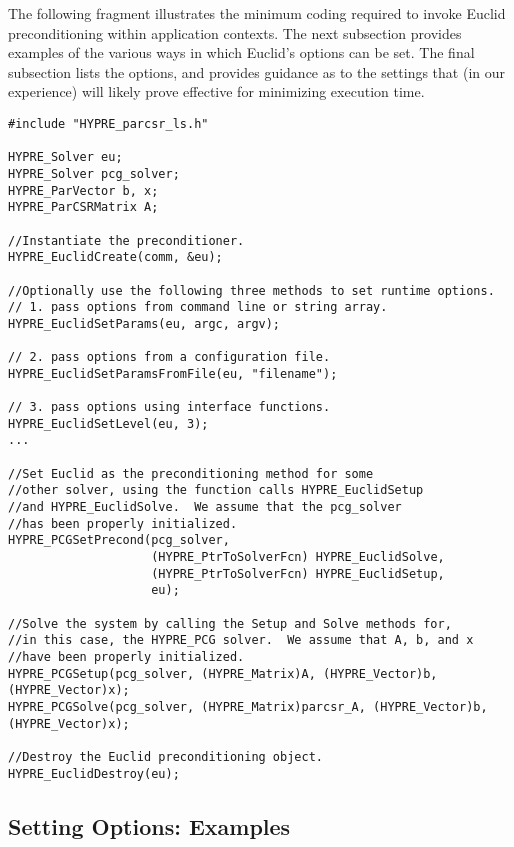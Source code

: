The following fragment illustrates the minimum coding %
required to invoke Euclid preconditioning within \hypre{} application contexts.
The next subsection provides examples of the various ways in which
Euclid's options can be set. 
The final subsection lists the options,
and provides guidance as to the settings that (in our experience) 
will likely prove effective for minimizing execution time.

\begin{display}
\begin{verbatim}
#include "HYPRE_parcsr_ls.h"

HYPRE_Solver eu;
HYPRE_Solver pcg_solver;
HYPRE_ParVector b, x;
HYPRE_ParCSRMatrix A;

//Instantiate the preconditioner.
HYPRE_EuclidCreate(comm, &eu);

//Optionally use the following three methods to set runtime options.
// 1. pass options from command line or string array.
HYPRE_EuclidSetParams(eu, argc, argv);

// 2. pass options from a configuration file.
HYPRE_EuclidSetParamsFromFile(eu, "filename");

// 3. pass options using interface functions.
HYPRE_EuclidSetLevel(eu, 3);
...

//Set Euclid as the preconditioning method for some
//other solver, using the function calls HYPRE_EuclidSetup
//and HYPRE_EuclidSolve.  We assume that the pcg_solver
//has been properly initialized.
HYPRE_PCGSetPrecond(pcg_solver,
                    (HYPRE_PtrToSolverFcn) HYPRE_EuclidSolve,
                    (HYPRE_PtrToSolverFcn) HYPRE_EuclidSetup,
                    eu);

//Solve the system by calling the Setup and Solve methods for, 
//in this case, the HYPRE_PCG solver.  We assume that A, b, and x
//have been properly initialized.
HYPRE_PCGSetup(pcg_solver, (HYPRE_Matrix)A, (HYPRE_Vector)b, (HYPRE_Vector)x);
HYPRE_PCGSolve(pcg_solver, (HYPRE_Matrix)parcsr_A, (HYPRE_Vector)b, (HYPRE_Vector)x);

//Destroy the Euclid preconditioning object.
HYPRE_EuclidDestroy(eu);

\end{verbatim}
\end{display}


\subsection{Setting Options: Examples}

